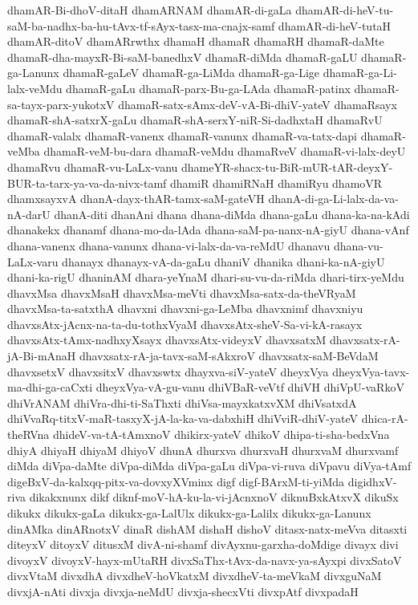 {dhamAR-Bi-dhoV-ditaH
dhamARNAM
dhamAR-di-gaLa
dhamAR-di-heV-tu-saM-ba-nadhx-ba-hu-tAvx-tf-sAyx-tasx-ma-cnajx-samf
dhamAR-di-heV-tutaH
dhamAR-ditoV
dhamARrwthx
dhamaH
dhamaR
dhamaRH
dhamaR-daMte
dhamaR-dha-mayxR-Bi-saM-banedhxV
dhamaR-diMda
dhamaR-gaLU
dhamaR-ga-Lanunx
dhamaR-gaLeV
dhamaR-ga-LiMda
dhamaR-ga-Lige
dhamaR-ga-Li-lalx-veMdu
dhamaR-gaLu
dhamaR-parx-Bu-ga-LAda
dhamaR-patinx
dhamaR-sa-tayx-parx-yukotxV
dhamaR-satx-sAmx-deV-vA-Bi-dhiV-yateV
dhamaRsayx
dhamaR-shA-satxrX-gaLu
dhamaR-shA-serxY-niR-Si-dadhxtaH
dhamaRvU
dhamaR-valalx
dhamaR-vanenx
dhamaR-vanunx
dhamaR-va-tatx-dapi
dhamaR-veMba
dhamaR-veM-bu-dara
dhamaR-veMdu
dhamaRveV
dhamaR-vi-lalx-deyU
dhamaRvu
dhamaR-vu-LaLx-vanu
dhameYR-shacx-tu-BiR-mUR-tAR-deyxY-BUR-ta-tarx-ya-va-da-nivx-tamf
dhamiR
dhamiRNaH
dhamiRyu
dhamoVR
dhamxsayxvA
dhanA-dayx-thAR-tamx-saM-gateVH
dhanA-di-ga-Li-lalx-da-va-nA-darU
dhanA-diti
dhanAni
dhana
dhana-diMda
dhana-gaLu
dhana-ka-na-kAdi
dhanakekx
dhanamf
dhana-mo-da-lAda
dhana-saM-pa-nanx-nA-giyU
dhana-vAnf
dhana-vanenx
dhana-vanunx
dhana-vi-lalx-da-va-reMdU
dhanavu
dhana-vu-LaLx-varu
dhanayx
dhanayx-vA-da-gaLu
dhaniV
dhanika
dhani-ka-nA-giyU
dhani-ka-rigU
dhaninAM
dhara-yeYnaM
dhari-su-vu-da-riMda
dhari-tirx-yeMdu
dhavxMsa
dhavxMsaH
dhavxMsa-meVti
dhavxMsa-satx-da-theVRyaM
dhavxMsa-ta-satxthA
dhavxni
dhavxni-ga-LeMba
dhavxnimf
dhavxniyu
dhavxsAtx-jAcnx-na-ta-du-tothxVyaM
dhavxsAtx-sheV-Sa-vi-kA-rasayx
dhavxsAtx-tAmx-nadhxyXsayx
dhavxsAtx-videyxV
dhavxsatxM
dhavxsatx-rA-jA-Bi-mAnaH
dhavxsatx-rA-ja-tavx-saM-sAkxroV
dhavxsatx-saM-BeVdaM
dhavxsetxV
dhavxsitxV
dhavxswtx
dhayxva-siV-yateV
dheyxVya
dheyxVya-tavx-ma-dhi-ga-caCxti
dheyxVya-vA-gu-vanu
dhiVBaR-veVtf
dhiVH
dhiVpU-vaRkoV
dhiVrANAM
dhiVra-dhi-ti-SaThxti
dhiVsa-mayxkatxvXM
dhiVsatxdA
dhiVvaRq-titxV-maR-tasxyX-jA-la-ka-va-dabxhiH
dhiVviR-dhiV-yateV
dhica-rA-theRVna
dhideV-va-tA-tAmxnoV
dhikirx-yateV
dhikoV
dhipa-ti-sha-bedxVna
dhiyA
dhiyaH
dhiyaM
dhiyoV
dhunA
dhurxva
dhurxvaH
dhurxvaM
dhurxvamf
diMda
diVpa-daMte
diVpa-diMda
diVpa-gaLu
diVpa-vi-ruva
diVpavu
diVya-tAmf
digeBxV-da-kalxqq-pitx-va-dovxyXVminx
digf
digf-BArxM-ti-yiMda
digidhxV-riva
dikakxnunx
dikf
diknf-moV-hA-ku-la-vi-jAcnxnoV
diknuBxkAtxvX
dikuSx
dikukx
dikukx-gaLa
dikukx-ga-LalUlx
dikukx-ga-Lalilx
dikukx-ga-Lanunx
dinAMka
dinARnotxV
dinaR
dishAM
dishaH
dishoV
ditasx-natx-meVva
ditasxti
diteyxV
ditoyxV
ditusxM
divA-ni-shamf
divAyxnu-garxha-doMdige
divayx
divi
divoyxV
divoyxV-hayx-mUtaRH
divxSaThx-tAvx-da-navx-ya-sAyxpi
divxSatoV
divxVtaM
divxdhA
divxdheV-hoVkatxM
divxdheV-ta-meVkaM
divxguNaM
divxjA-nAti
divxja
divxja-neMdU
divxja-shecxVti
divxpAtf
divxpadaH
}
